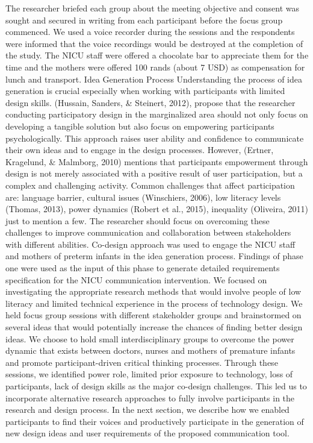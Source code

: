 The researcher briefed each group about the meeting objective and consent was sought and secured in writing from each participant before the focus group commenced. We used a voice recorder during the sessions and the respondents were informed that the voice recordings would be destroyed at the completion of the study. The NICU staff were offered a chocolate bar to appreciate them for the time and the mothers were offered 100 rands (about 7 USD) as compensation for lunch and transport.
Idea Generation Process
Understanding the process of idea generation is crucial especially when working with participants with limited design skills. (Hussain, Sanders, & Steinert, 2012), propose that the researcher conducting participatory design in the marginalized area should not only focus on developing a tangible solution but also focus on empowering participants psychologically. This approach raises user ability and confidence to communicate their own ideas and to engage in the design processes. However, (Ertner, Kragelund, & Malmborg, 2010) mentions that participants empowerment through design is not merely associated with a positive result of user participation, but a complex and challenging activity. Common challenges that affect participation are:  language barrier, cultural issues (Winschiers, 2006), low literacy levels (Thomas, 2013), power dynamics (Robert et al., 2015), inequality (Oliveira, 2011) just to mention a few. The researcher should focus on overcoming these challenges to improve communication and collaboration between stakeholders with different abilities.  
Co-design approach was used to engage the NICU staff and mothers of preterm infants in the idea generation process. Findings of phase one were used as the input of this phase to generate detailed requirements specification for the NICU communication intervention. We focused on investigating the appropriate research methods that would involve people of low literacy and limited technical experience in the process of technology design. We held focus group sessions with different stakeholder groups and brainstormed on several ideas that would potentially increase the chances of finding better design ideas. We choose to hold small interdisciplinary groups to overcome the power dynamic that exists between doctors, nurses and mothers of premature infants and promote participant-driven critical thinking processes.
Through these sessions, we identified power role, limited prior exposure to technology, loss of participants, lack of design skills as the major co-design challenges. This led us to incorporate alternative research approaches to fully involve participants in the research and design process.  In the next section, we describe how we enabled participants to find their voices and productively participate in the generation of new design ideas and user requirements of the proposed communication tool.

